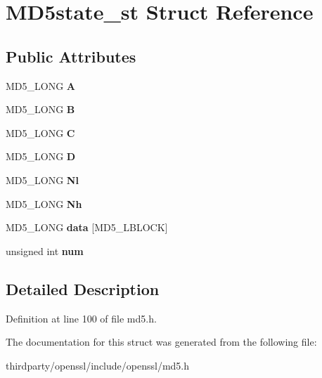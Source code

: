 \hypertarget{struct_m_d5state__st}{}\section{M\+D5state\+\_\+st Struct Reference}
\label{struct_m_d5state__st}
\subsection*{Public Attributes}
\begin{DoxyCompactItemize}
\item 
\mbox{\label{struct_m_d5state__st_ac01316cea74aeb98bb8d557f57c85a08}} 
M\+D5\+\_\+\+L\+O\+NG {\bfseries A}
\item 
\mbox{\label{struct_m_d5state__st_a0a0927f6cc209cb0d4565a89af43e59c}} 
M\+D5\+\_\+\+L\+O\+NG {\bfseries B}
\item 
\mbox{\label{struct_m_d5state__st_a90da41912fea04ac78eb4c580744e79b}} 
M\+D5\+\_\+\+L\+O\+NG {\bfseries C}
\item 
\mbox{\label{struct_m_d5state__st_a1bd5cc2fd46230a9b3ca542ce941447e}} 
M\+D5\+\_\+\+L\+O\+NG {\bfseries D}
\item 
\mbox{\label{struct_m_d5state__st_accb86d088daeafde5a370fb8a2961bd7}} 
M\+D5\+\_\+\+L\+O\+NG {\bfseries Nl}
\item 
\mbox{\label{struct_m_d5state__st_a2eb6f766a15bf4987f75eda8f954e1f2}} 
M\+D5\+\_\+\+L\+O\+NG {\bfseries Nh}
\item 
\mbox{\label{struct_m_d5state__st_a00b0904b7f53a7a3fc899f56af14d207}} 
M\+D5\+\_\+\+L\+O\+NG {\bfseries data} \mbox{[}M\+D5\+\_\+\+L\+B\+L\+O\+CK\mbox{]}
\item 
\mbox{\label{struct_m_d5state__st_ae35c099cfb7bdf972b4419998c7efc92}} 
unsigned int {\bfseries num}
\end{DoxyCompactItemize}


\subsection{Detailed Description}


Definition at line 100 of file md5.\+h.



The documentation for this struct was generated from the following file\+:\begin{DoxyCompactItemize}
\item 
thirdparty/openssl/include/openssl/md5.\+h\end{DoxyCompactItemize}
